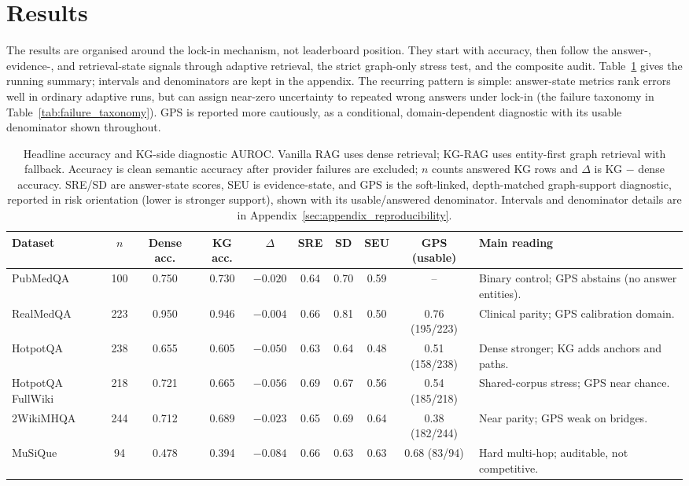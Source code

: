\section{Results}
\label{sec:results}

The results are organised around the lock-in mechanism, not leaderboard
position. They start with accuracy, then follow the answer-, evidence-, and
retrieval-state signals through adaptive retrieval, the strict graph-only
stress test, and the composite audit. Table~\ref{tab:results_snapshot} gives
the running summary; intervals and denominators are kept in the appendix.
The recurring pattern is simple: answer-state metrics rank errors well in
ordinary adaptive runs, but can assign near-zero uncertainty to repeated wrong
answers under lock-in (the failure taxonomy in Table~\ref{tab:failure_taxonomy}). GPS is reported more
cautiously, as a conditional, domain-dependent diagnostic with its usable
denominator shown throughout.

\begin{table}[t]
\centering
\scriptsize
\caption{%
  Headline accuracy and KG-side diagnostic AUROC.
  Vanilla RAG uses dense retrieval; KG-RAG uses entity-first graph retrieval
  with fallback.
  Accuracy is clean semantic accuracy after provider failures are excluded;
  $n$ counts answered KG rows and $\Delta$ is KG $-$ dense accuracy.
  SRE/SD are answer-state scores, SEU is evidence-state, and GPS is the
  soft-linked, depth-matched graph-support diagnostic, reported in risk
  orientation (lower is stronger support), shown with its
  usable/answered denominator.
  Intervals and denominator details are in
  Appendix~\ref{sec:appendix_reproducibility}.%
}
\label{tab:results_snapshot}
\setlength{\tabcolsep}{3.2pt}
\begin{tabular}{@{}lccccccccp{2.6cm}@{}}
\toprule
Dataset & $n$ & Dense acc. & KG acc. & $\Delta$ & SRE & SD & SEU & GPS (usable) & Main reading \\
\midrule
PubMedQA & 100 & 0.750 & 0.730 & $-0.020$ & 0.64 & 0.70 & 0.59 & -- &
Binary control; GPS abstains (no answer entities). \\
RealMedQA & 223 & 0.950 & 0.946 & $-0.004$ & 0.66 & 0.81 & 0.50 & 0.76 (195/223) &
Clinical parity; GPS calibration domain. \\
HotpotQA & 238 & 0.655 & 0.605 & $-0.050$ & 0.63 & 0.64 & 0.48 & 0.51 (158/238) &
Dense stronger; KG adds anchors and paths. \\
HotpotQA FullWiki & 218 & 0.721 & 0.665 & $-0.056$ & 0.69 & 0.67 & 0.56 & 0.54 (185/218) &
Shared-corpus stress; GPS near chance. \\
2WikiMHQA & 244 & 0.712 & 0.689 & $-0.023$ & 0.65 & 0.69 & 0.64 & 0.38 (182/244) &
Near parity; GPS weak on bridges. \\
MuSiQue & 94 & 0.478 & 0.394 & $-0.084$ & 0.66 & 0.63 & 0.63 & 0.68 (83/94) &
Hard multi-hop; auditable, not competitive. \\
\bottomrule
\end{tabular}
\end{table}

